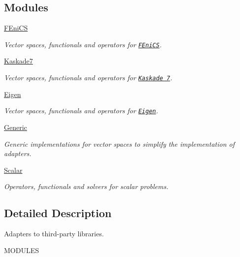 \subsection*{Modules}
\begin{DoxyCompactItemize}
\item 
\hyperlink{group__FenicsGroup}{F\+Eni\+C\+S}
\begin{DoxyCompactList}\small\item\em Vector spaces, functionals and operators for \href{http://www.fenicsproject.org}{\tt F\+Eni\+C\+S}. \end{DoxyCompactList}\item 
\hyperlink{group__KaskadeGroup}{Kaskade7}
\begin{DoxyCompactList}\small\item\em Vector spaces, functionals and operators for \href{http://www.zib.de/projects/kaskade7-finite-element-toolbox}{\tt Kaskade 7}. \end{DoxyCompactList}\item 
\hyperlink{group__EigenGroup}{Eigen}
\begin{DoxyCompactList}\small\item\em Vector spaces, functionals and operators for \href{http://eigen.tuxfamily.org}{\tt Eigen}. \end{DoxyCompactList}\item 
\hyperlink{group__GenericGroup}{Generic}
\begin{DoxyCompactList}\small\item\em Generic implementations for vector spaces to simplify the implementation of adapters. \end{DoxyCompactList}\item 
\hyperlink{group__ScalarGroup}{Scalar}
\begin{DoxyCompactList}\small\item\em Operators, functionals and solvers for scalar problems. \end{DoxyCompactList}\end{DoxyCompactItemize}


\subsection{Detailed Description}
Adapters to third-\/party libraries. 

M\+O\+D\+U\+L\+E\+S 